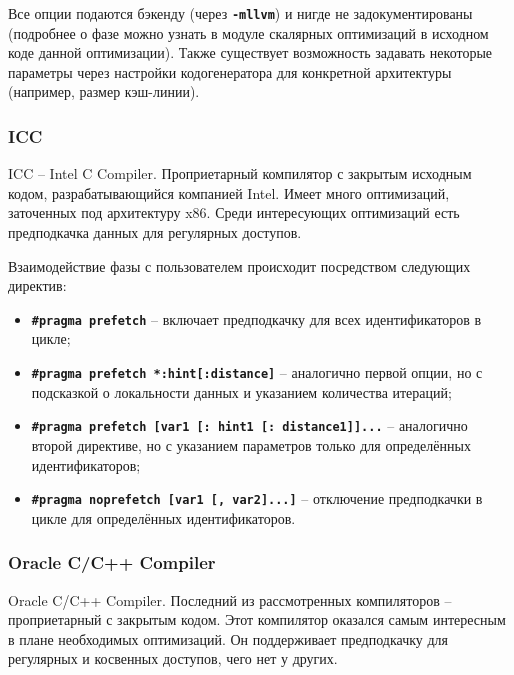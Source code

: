 \documentclass[12pt,a4paper,oneside]{article}
\begin{document}
Все опции подаются бэкенду (через \texttt{\textbf{-mllvm}}) и нигде не задокументированы (подробнее о фазе можно узнать в модуле скалярных оптимизаций в исходном коде данной оптимизации). Также существует возможность задавать некоторые параметры через настройки кодогенератора для конкретной архитектуры (например, размер кэш-линии).

\subsubsection{ICC}

\indent

ICC -- Intel C Compiler. Проприетарный компилятор с закрытым исходным кодом, разрабатывающийся компанией Intel. Имеет много оптимизаций, заточенных под архитектуру x86. Среди интересующих оптимизаций есть предподкачка данных для регулярных доступов.

Взаимодействие фазы с пользователем происходит посредством следующих директив\cite{ICC}:
\begin{itemize}
\item \texttt{\textbf{\#pragma prefetch}} -- включает предподкачку для всех идентификаторов в цикле;
\item \texttt{\textbf{\#pragma prefetch *:hint[:distance]}} -- аналогично первой опции, но с подсказкой о локальности данных и указанием количества итераций;
\item \texttt{\textbf{\#pragma prefetch [var1 [: hint1 [: distance1]]...}} -- аналогично второй директиве, но с указанием параметров только для определённых идентификаторов;
\item \texttt{\textbf{\#pragma noprefetch [var1 [, var2]...]}} -- отключение предподкачки в цикле для определённых идентификаторов.
\end{itemize}

\subsubsection{Oracle C/C++ Compiler}

\indent

Oracle C/C++ Compiler. Последний из рассмотренных компиляторов -- проприетарный с закрытым кодом. Этот компилятор оказался самым интересным в плане необходимых оптимизаций. Он поддерживает предподкачку для регулярных и косвенных доступов, чего нет у других.
\end{document}
